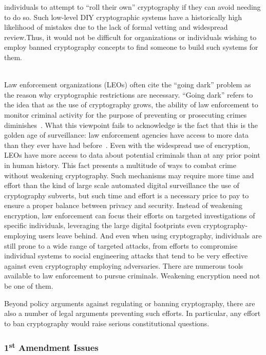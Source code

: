 \begin{packed_desc}
{    individuals to attempt to ``roll their own'' cryptography if they
    can avoid needing to do so. Such low-level DIY cryptographic
    systems have a historically high likelihood of mistakes due to the
    lack of formal vetting and widespread review.}Thus, it would not
  be difficult for organizations or individuals wishing to employ
  banned cryptography concepts to find someone to build such systems
  for them.
\item[Better Options] \hfill \\ Law enforcement organizations (LEOs)
  often cite the ``going dark'' problem as the reason why
  cryptographic restrictions are necessary. ``Going dark'' refers to
  the idea that as the use of cryptography grows, the ability of law
  enforcement to monitor criminal activity for the purpose of
  preventing or prosecuting crimes
  diminishes~\cite{anderson2013}. What this viewpoint fails to
  acknowledge is the fact that this is the golden age of surveillance:
  law enforcement agencies have access to more data than they ever
  have had before~\cite{swire2011}. Even with the widespread use of
  encryption, LEOs have more access to data about potential criminals
  than at any prior point in human history. This fact presents a
  multitude of ways to combat crime without weakening
  cryptography. Such mechanisms may require more time and effort than
  the kind of large scale automated digital surveillance the use of
  cryptography subverts, but such time and effort is a necessary price
  to pay to ensure a proper balance between privacy and security.
  Instead of weakening encryption, law enforcement can focus their
  efforts on targeted investigations of specific individuals,
  leveraging the large digital footprints even cryptography-employing
  users leave behind. And even when using cryptography, individuals
  are still prone to a wide range of targeted attacks, from efforts to
  compromise individual systems to social engineering attacks that
  tend to be very effective against even cryptography employing
  adversaries. There are numerous tools available to law enforcement
  to pursue criminals. Weakening encryption need not be one of them.
\end{packed_desc}

Beyond policy arguments against regulating or banning cryptography,
there are also a number of legal arguments preventing such efforts. In
particular, any effort to ban cryptography would raise serious
constitutional questions.

\subsubsection{1\textsuperscript{st} Amendment Issues}

